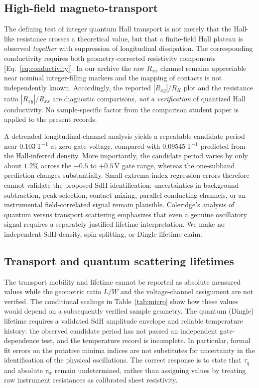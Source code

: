 \documentclass[
    aps,
    prb, 
    twocolumn, superscriptaddress,
    amsmath,
    amssymb,
    floatfix
]{revtex4-2}
\begin{document}
\subsection{High-field magneto-transport}
The defining test of integer quantum Hall transport is not merely that the Hall-like resistance crosses a theoretical value, but that a finite-field Hall plateau is observed \emph{together} with suppression of longitudinal dissipation. The corresponding conductivity requires both geometry-corrected resistivity components [Eq.~\eqref{eq:conductivity}]\cite{klitzing1980,halperin1982,buttiker1988}. In our archive the raw $R_{xx}$ channel remains appreciable near nominal integer-filling markers and the mapping of contacts is not independently known. Accordingly, the reported $|R_{xy}|/R_K$ plot and the resistance ratio $|R_{xy}|/R_{xx}$ are diagnostic comparisons, \emph{not a verification} of quantized Hall conductivity. No sample-specific factor from the comparison student paper is applied to the present records.

A detrended longitudinal-channel analysis yields a repeatable candidate period near $0.103\,$T$^{-1}$ at zero gate voltage, compared with $0.09545\,$T$^{-1}$ predicted from the Hall-inferred density. More importantly, the candidate period varies by only about $1.2\%$ across the $-0.5$ to $+0.5\,$V gate range, whereas the one-subband prediction changes substantially. Small extrema-index regression errors therefore cannot validate the proposed SdH identification: uncertainties in background subtraction, peak selection, contact mixing, parallel conducting channels, or an instrumental field-correlated signal remain plausible. Coleridge's analysis of quantum versus transport scattering emphasizes that even a genuine oscillatory signal requires a separately justified lifetime interpretation\cite{coleridge1991,dingle1952,shoenberg1984}. We make no independent SdH-density, spin-splitting, or Dingle-lifetime claim.

\subsection{Transport and quantum scattering lifetimes}
The transport mobility and lifetime cannot be reported as absolute measured values while the geometric ratio $L/W$ and the voltage-channel assignment are not verified. The conditional scalings in Table~\ref{tab:micro} show how these values would depend on a subsequently verified sample geometry. The quantum (Dingle) lifetime requires a validated SdH amplitude envelope and reliable temperature history: the observed candidate period has not passed an independent gate-dependence test, and the temperature record is incomplete. In particular, formal fit errors on the putative minima indices are not substitutes for uncertainty in the identification of the physical oscillations\cite{coleridge1991,dingle1952,shoenberg1984}. The correct response is to state that $\tau_q$ and absolute $\tau_{\mathrm{tr}}$ remain undetermined, rather than assigning values by treating raw instrument resistances as calibrated sheet resistivity.
\end{document}
